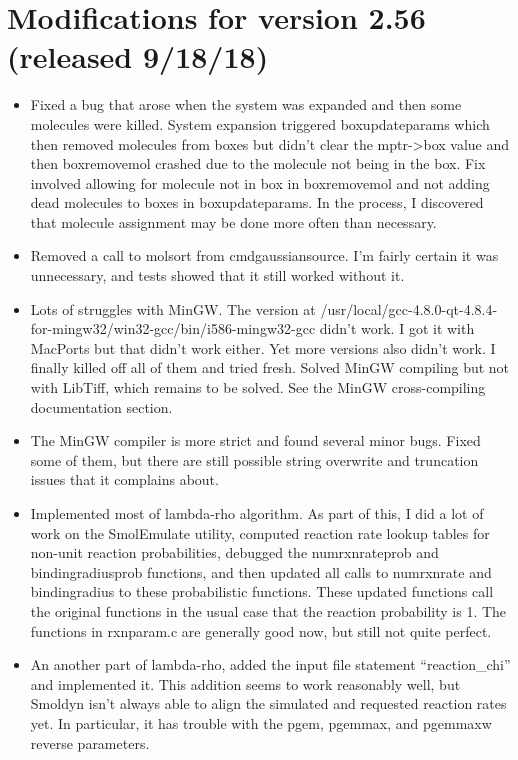 \documentclass {scrbook}
\begin{document}
\section{Modifications for version 2.56 (released 9/18/18)}
\begin{itemize}
\item Fixed a bug that arose when the system was expanded and then some molecules were killed. System expansion triggered boxupdateparams which then removed molecules from boxes but didn't clear the mptr->box value and then boxremovemol crashed due to the molecule not being in the box. Fix involved allowing for molecule not in box in boxremovemol and not adding dead molecules to boxes in boxupdateparams. In the process, I discovered that molecule assignment may be done more often than necessary.
\item Removed a call to molsort from cmdgaussiansource. I'm fairly certain it was unnecessary, and tests showed that it still worked without it.
\item Lots of struggles with MinGW. The version at /usr/local/gcc-4.8.0-qt-4.8.4-for-mingw32/win32-gcc/bin/i586-mingw32-gcc didn't work. I got it with MacPorts but that didn't work either. Yet more versions also didn't work. I finally killed off all of them and tried fresh. Solved MinGW compiling but not with LibTiff, which remains to be solved. See the MinGW cross-compiling documentation section.
\item The MinGW compiler is more strict and found several minor bugs. Fixed some of them, but there are still possible string overwrite and truncation issues that it complains about.
\item Implemented most of lambda-rho algorithm. As part of this, I did a lot of work on the SmolEmulate utility, computed reaction rate lookup tables for non-unit reaction probabilities, debugged the numrxnrateprob and bindingradiusprob functions, and then updated all calls to numrxnrate and bindingradius to these probabilistic functions. These updated functions call the original functions in the usual case that the reaction probability is 1. The functions in rxnparam.c are generally good now, but still not quite perfect.
\item An another part of lambda-rho, added the input file statement ``reaction\_chi'' and implemented it. This addition seems to work reasonably well, but Smoldyn isn't always able to align the simulated and requested reaction rates yet. In particular, it has trouble with the pgem, pgemmax, and pgemmaxw reverse parameters.
\end{itemize}
\end{document}
